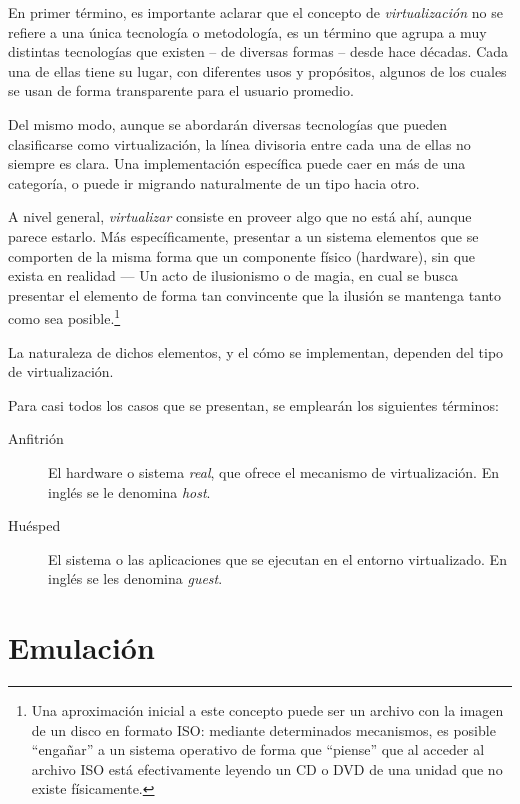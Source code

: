\documentclass[11pt,fleqn]{book} %
\begin{document}
En primer término, es importante aclarar que el concepto de \emph{virtualización} 
no se refiere a una única tecnología o metodología, es un término que
agrupa a muy distintas tecnologías que existen – de
diversas formas – desde hace décadas. Cada una de ellas tiene su lugar,
con diferentes usos y propósitos, algunos de los cuales se usan de forma
transparente para el usuario promedio.

Del mismo modo, aunque se abordarán diversas tecnologías que pueden
clasificarse como virtualización, la línea divisoria entre cada una de ellas no
siempre es clara. Una implementación específica puede caer en más
de una categoría, o puede ir migrando naturalmente de un tipo hacia
otro.

A nivel general, \emph{virtualizar} consiste en proveer algo que no está ahí,
aunque parece estarlo. Más específicamente, presentar a un sistema elementos
que se comporten de la misma forma que un componente físico (hardware), sin que 
exista en realidad — Un acto de ilusionismo o de magia, en cual se busca
presentar el elemento de forma tan convincente que la ilusión se mantenga tanto
como sea posible.\footnote{Una aproximación inicial a este concepto puede ser
un archivo con la imagen de un disco en formato ISO: mediante determinados mecanismos, es posible
``engañar'' a un sistema operativo de forma que ``piense'' que al acceder al archivo ISO
está efectivamente leyendo un CD o DVD de una unidad que no existe físicamente. }

La naturaleza de dichos elementos, y el cómo se implementan, dependen del
tipo de virtualización.

Para casi todos los casos que se presentan, se emplearán los siguientes términos:

\begin{description}
\item[Anfitrión] El hardware o sistema \emph{real}, que ofrece el mecanismo de
               virtualización. En inglés se le denomina \emph{host}.
\item[Huésped] El sistema o las aplicaciones que se ejecutan en el entorno
	     virtualizado. En inglés se les denomina \emph{guest}.
\end{description}
\section{Emulación}
\label{sec-9-2}
\end{document}
